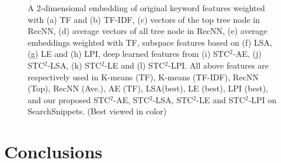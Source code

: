 \documentclass[review]{elsarticle}
\begin{document}
\begin{figure}[h!]
\centering
\vspace{-0.1cm}
\vspace{-0.1cm}
\vspace{-0.1cm}
\vspace{-0.1cm}
\vspace{-0.1cm}
\vspace{-0.1cm}
\vspace{-0.1cm}
\vspace{-0.1cm}
\vspace{-0.1cm}
\vspace{-0.1cm}
\vspace{-0.1cm}
\vspace{-0.1cm}
\vspace{-0.1cm}
\vspace{-0.1cm}
\caption{A 2-dimensional embedding of original keyword features weighted with (a) TF and (b) TF-IDF, (c) vectors of the top tree node in RecNN, (d) average vectors of all tree node in RecNN, (e) average embeddings weighted with TF, subspace features based on (f) LSA, (g) LE and (h) LPI, deep learned features from (i) STC$^2$-AE, (j) STC$^2$-LSA, (k) STC$^2$-LE and (l) STC$^2$-LPI. All above features are respectively used in K-means (TF), K-means (TF-IDF), RecNN (Top), RecNN (Ave.), AE (TF), LSA(best), LE (best), LPI (best), and our proposed STC$^2$-AE, STC$^2$-LSA, STC$^2$-LE and STC$^2$-LPI on SearchSnippets. (Best viewed in color)}
\vspace{-0.2cm}
\label{fig:all2dSearchSnippets}
\end{figure}

\section{Conclusions}
\label{sec:DiscussionANDConclusions}
\end{document}
